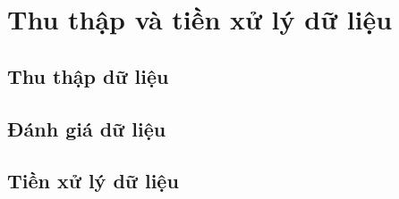 \section{Thu thập và tiền xử lý dữ liệu}
\subsection{Thu thập dữ liệu}
\subsection{Đánh giá dữ liệu}
\subsection{Tiền xử lý dữ liệu}
